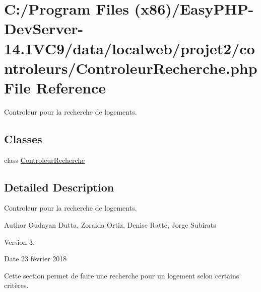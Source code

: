 \hypertarget{_controleur_recherche_8php}{}\section{C\+:/\+Program Files (x86)/\+Easy\+P\+H\+P-\/\+Dev\+Server-\/14.1\+V\+C9/data/localweb/projet2/controleurs/\+Controleur\+Recherche.php File Reference}
\label{_controleur_recherche_8php}


Controleur pour la recherche de logements.  


\subsection*{Classes}
\begin{DoxyCompactItemize}
\item 
class \hyperlink{class_controleur_recherche}{Controleur\+Recherche}
\end{DoxyCompactItemize}


\subsection{Detailed Description}
Controleur pour la recherche de logements. 

\begin{DoxyAuthor}{Author}
Oudayan Dutta, Zoraida Ortiz, Denise Ratté, Jorge Subirats 
\end{DoxyAuthor}
\begin{DoxyVersion}{Version}
3. 
\end{DoxyVersion}
\begin{DoxyDate}{Date}
23 février 2018
\end{DoxyDate}
Cette section permet de faire une recherche pour un logement selon certains critères. 